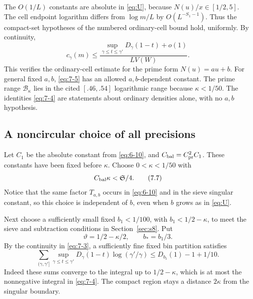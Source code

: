 \documentclass[11pt]{article}
\theoremstyle{definition}
\theoremstyle{definition}
\begin{document}
The \(O(1/L)\) constants are absolute in \eqref{eq:U}, because \(N(u)/x\in[1/2,5]\). The cell endpoint logarithm differs from \(\log m/L\) by \(O(L^{-S_1-1})\). Thus the compact-set hypotheses of the numbered ordinary-cell bound hold, uniformly. By continuity,
\begin{equation}
c_\gamma(m)\le
 \frac{\sup_{\gamma\le t\le\gamma'}D_\gamma(1-t)+o(1)}
                                      {LV(W)}.         \tag{7.6}\label{eq:7-6}
\end{equation}
This verifies the ordinary-cell estimate for the prime form \(N(u)=au+b\). For general fixed \(a,b\), \eqref{eq:7-5} has an allowed \(a,b\)-dependent constant. The prime range \(\mathcal B_\kappa\) lies in the cited \([.46,.54]\) logarithmic range because \(\kappa<1/50\). The identities \eqref{eq:7-4} are statements about ordinary densities alone, with no \(a,b\) hypothesis.

\subsection{A noncircular choice of all precisions}\label{sec:s7.2}

Let \(C_1\) be the absolute constant from \eqref{eq:6-10}, and \(C_{\rm bal}=C_{\rm pr}^2C_1\). These constants have been fixed before \(\kappa\). Choose \(0<\kappa<1/50\) with
\begin{equation}
C_{\rm bal}\kappa<\mathfrak S/4.                       \tag{7.7}\label{eq:7-7}
\end{equation}
Notice that the same factor \(T_{a,b}\) occurs in \eqref{eq:6-10} and in the sieve singular constant, so this choice is independent of \(b\), even when \(b\) grows as in \eqref{eq:U}.

Next choose a sufficiently small fixed \(b_1<1/100\), with \(b_1<1/2-\kappa\), to meet the sieve and subtraction conditions in Section~\ref{sec:s8}. Put
\begin{equation*}
\vartheta=1/2-\kappa/2,\qquad b_*=b_1/3.
\end{equation*}
By the continuity in \eqref{eq:7-3}, a sufficiently fine fixed bin partition satisfies
\begin{equation}
\sum_{(\gamma,\gamma']}
 \sup_{\gamma\le t\le\gamma'}D_\gamma(1-t)\log(\gamma'/\gamma)
       \le D_{b_1}(1)-1+1/10.                          \tag{7.8}\label{eq:7-8}
\end{equation}
Indeed these sums converge to the integral up to \(1/2-\kappa\), which is at most the nonnegative integral in \eqref{eq:7-4}. The compact region stays a distance \(2\kappa\) from the singular boundary.
\end{document}
